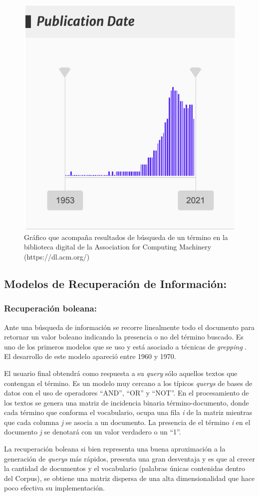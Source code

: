 \documentclass[
  10,
  openany]{book}
\begin{document}
\begin{figure}

\includegraphics[width=0.3\linewidth]{images/03-marco-teorico/busquedaacm} \hfill{}

\caption{Gráfico que acompaña resultados de búsqueda de un término en la biblioteca digital de la Association for Computing Machinery (https://dl.acm.org/)}\label{fig:busquedasacm}
\end{figure}

\hypertarget{MRI}{%
\subsection{Modelos de Recuperación de Información:}\label{MRI}}

\hypertarget{MRIbol}{%
\subsubsection{Recuperación boleana:}\label{MRIbol}}

Ante una búsqueda de información se recorre linealmente todo el documento para retornar un valor boleano indicando la presencia o no del término buscado. Es uno de los primeros modelos que se uso y está asociado a técnicas de \emph{grepping} \citep{manning2008}. El desarrollo de este modelo apareció entre 1960 y 1970.

El usuario final obtendrá como respuesta a su \emph{query} sólo aquellos textos que contengan el término. Es un modelo muy cercano a los típicos \emph{querys} de bases de datos con el uso de operadores ``AND'', ``OR'' y ``NOT''. En el procesamiento de los textos se genera una matriz de incidencia binaria término-documento, donde cada término que conforma el vocabulario, ocupa una fila \emph{i} de la matriz mientras que cada columna \emph{j} se asocia a un documento. La presencia de el término \emph{i} en el documento \emph{j} se denotará con un valor verdadero o un ``1''.

La recuperación boleana si bien representa una buena aproximación a la generación de \emph{querys} más rápidos, presenta una gran desventaja y es que al crecer la cantidad de documentos y el vocabulario (palabras únicas contenidas dentro del Corpus), se obtiene una matriz dispersa de una alta dimensionalidad que hace poco efectiva su implementación.
\end{document}
